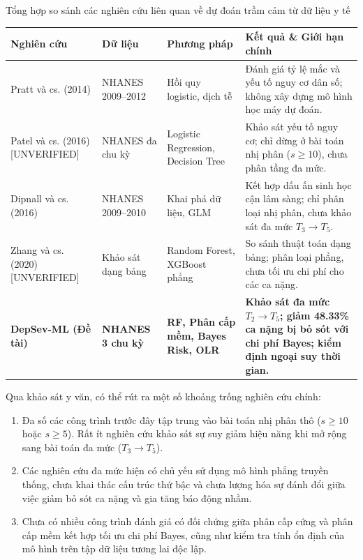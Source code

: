 \begin{table}[htbp]{Tổng hợp so sánh các nghiên cứu liên quan về dự đoán trầm cảm từ dữ liệu y tế}
\centering
\small
\setlength{\tabcolsep}{4pt}
\label{tab:related-works}
\begin{tabularx}{\textwidth}{p{3.0cm} p{2.2cm} p{3.4cm} X}
\toprule
\textbf{Nghiên cứu} & \textbf{Dữ liệu} & \textbf{Phương pháp} & \textbf{Kết quả \& Giới hạn chính} \\
\midrule
Pratt và cs. (2014) \cite{pratt2014depression} & NHANES 2009--2012 & Hồi quy logistic, dịch tễ & Đánh giá tỷ lệ mắc và yếu tố nguy cơ dân số; không xây dựng mô hình học máy dự đoán. \\
\midrule
Patel và cs. (2016) \cite{patel2016systematic} [UNVERIFIED] & NHANES đa chu kỳ & Logistic Regression, Decision Tree & Khảo sát yếu tố nguy cơ; chỉ dừng ở bài toán nhị phân ($s \ge 10$), chưa phân tầng đa mức. \\
\midrule
Dipnall và cs. (2016) \cite{dipnall2016fusing} & NHANES 2009--2010 & Khai phá dữ liệu, GLM & Kết hợp dấu ấn sinh học cận lâm sàng; chỉ phân loại nhị phân, chưa khảo sát đa mức $T_3 \to T_5$. \\
\midrule
Zhang và cs. (2020) \cite{zhang2020machine} [UNVERIFIED] & Khảo sát dạng bảng & Random Forest, XGBoost phẳng & So sánh thuật toán dạng bảng; phân loại phẳng, chưa tối ưu chi phí cho các ca nặng. \\
\midrule
\textbf{DepSev-ML (Đề tài)} & \textbf{NHANES 3 chu kỳ} & \textbf{RF, Phân cấp mềm, Bayes Risk, OLR} & \textbf{Khảo sát đa mức $T_2 \to T_5$; giảm 48.33\% ca nặng bị bỏ sót với chi phí Bayes; kiểm định ngoại suy thời gian.} \\
\bottomrule
\end{tabularx}
\end{table}

Qua khảo sát y văn, có thể rút ra một số khoảng trống nghiên cứu chính:
\begin{enumerate}
    \item Đa số các công trình trước đây tập trung vào bài toán nhị phân thô ($s \ge 10$ hoặc $s \ge 5$). Rất ít nghiên cứu khảo sát sự suy giảm hiệu năng khi mở rộng sang bài toán đa mức ($T_3 \to T_5$).
    \item Các nghiên cứu đa mức hiện có chủ yếu sử dụng mô hình phẳng truyền thống, chưa khai thác cấu trúc thứ bậc và chưa lượng hóa sự đánh đổi giữa việc giảm bỏ sót ca nặng và gia tăng báo động nhầm.
    \item Chưa có nhiều công trình đánh giá có đối chứng giữa phân cấp cứng và phân cấp mềm kết hợp tối ưu chi phí Bayes, cũng như kiểm tra tính ổn định của mô hình trên tập dữ liệu tương lai độc lập.
\end{enumerate}

